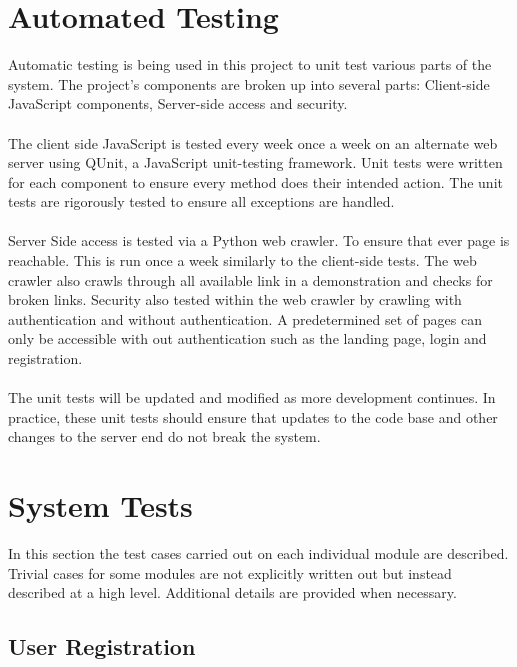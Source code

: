 \documentclass[12pt]{article}
\begin{document}
\section{Automated Testing}
Automatic testing is being used in this project to unit test various parts of the system. The project's components are broken up into several parts: Client-side JavaScript components, Server-side access and security.
\\ \\
The client side JavaScript is tested every week once a week on an alternate web server using QUnit, a JavaScript unit-testing framework. Unit tests were written for each component to ensure every method does their intended action. The unit tests are rigorously tested to ensure all exceptions are handled.
\\ \\
Server Side access is tested via a Python web crawler. To ensure that ever page is reachable. This is run once a week similarly to the client-side tests. The web crawler also crawls through all available link in a demonstration and checks for broken links. Security also tested within the web crawler by crawling with authentication and without authentication. A predetermined set of pages can only be accessible with out authentication such as the landing page, login and registration.
\\ \\
The unit tests will be updated and modified as more development continues. In practice, these unit tests should ensure that updates to the code base and other changes to the server end do not break the system.


\section{System Tests}
In this section the test cases carried out on each individual module are described. Trivial cases for some modules are not explicitly written out but instead described at a high level. Additional details are provided when necessary.

\pagebreak

\subsection{User Registration}
\end{document}
